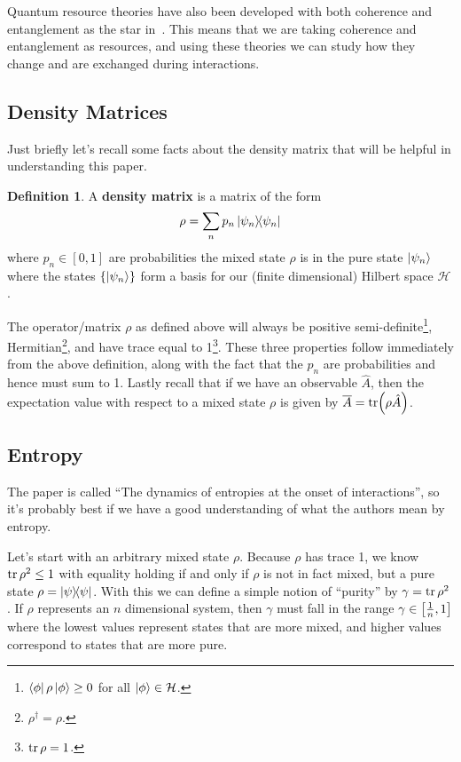 \documentclass[11pt,english]{article}
\theoremstyle{definition}
\newtheorem{definition}{Definition}[section]
\begin{document}
Quantum resource theories have also been developed with both coherence and entanglement as the star in~\cite{quantum-resources}. This means that we are taking coherence and entanglement as resources, and using these theories we can study how they change and are exchanged during interactions.

\subsection{Density Matrices}\label{sec:density-matrices}
Just briefly let's recall some facts about the density matrix that will be helpful in understanding this paper.
\begin{definition}
	A \textbf{density matrix} is a matrix of the form
	\begin{equation*}
		\rho = \sum_n p_n\ketbra{\psi_n}
	\end{equation*}
	where $p_n\in[0,1]$ are probabilities the mixed state $\rho$ is in the pure state $\ket{\psi_n}$ where the states $\{\ket{\psi_n}\}$ form a basis for our (finite dimensional) Hilbert space $\mathcal{H}$.
\end{definition}
The operator/matrix $\rho$ as defined above will always be positive semi-definite\footnote{$\bra{\phi}\rho\ket{\phi}\geq 0$ for all $\ket{\phi}\in\mathcal{H}$.}, Hermitian\footnote{$\rho^\dagger = \rho$.}, and have trace equal to 1\footnote{$\tr\rho = 1$.}. These three properties follow immediately from the above definition, along with the fact that the $p_n$ are probabilities and hence must sum to 1. Lastly recall that if we have an observable $\hat{A}$, then the expectation value with respect to a mixed state $\rho$ is given by $\overline{A} = \tr(\rho\hat{A})$.

\subsection{Entropy}
The paper is called ``The dynamics of entropies at the onset of interactions'', so it's probably best if we have a good understanding of what the authors mean by entropy.

Let's start with an arbitrary mixed state $\rho$. Because $\rho$ has trace 1, we know $\tr\rho^2\leq 1$ with equality holding if and only if $\rho$ is not in fact mixed, but a pure state $\rho = \ketbra{\psi}$. With this we can define a simple notion of ``purity'' by $\gamma = \tr\rho^2$. If $\rho$ represents an $n$ dimensional system, then $\gamma$ must fall in the range $\gamma\in\qty[\frac{1}{n}, 1]$ where the lowest values represent states that are more mixed, and higher values correspond to states that are more pure.
\end{document}

